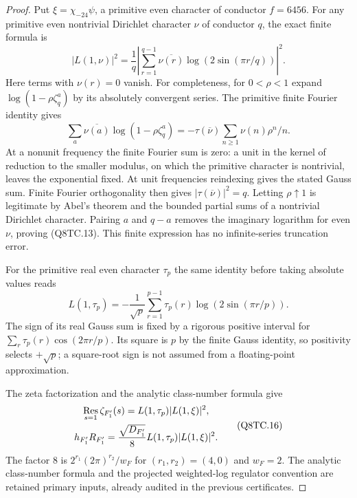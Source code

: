 \begin{proof}
Put $\xi=\chi_{-24}\psi$, a primitive even character of
conductor $f=6456$.
For any primitive even nontrivial Dirichlet character $\nu$ of
conductor $q$, the exact finite formula is
\[
 \left|L(1,\nu)\right|^2
   =\frac1q\left|
       \sum_{r=1}^{q-1}\overline{\nu(r)}
                     \log(2\sin(\pi r/q))\right|^2.
 \tag{Q8TC.13}
\]
Here terms with $\nu(r)=0$ vanish.
For completeness, for $0<\rho<1$ expand
$\log(1-\rho\zeta_q^a)$ by its absolutely convergent series.
The primitive finite Fourier identity gives
\[
 \sum_a\overline{\nu(a)}\log(1-\rho\zeta_q^a)
    =-\tau(\overline\nu)
                         \sum_{n\geq1}\nu(n)\rho^n/n.
 \tag{Q8TC.14}
\]
At a nonunit frequency the finite Fourier sum is zero: a unit
in the kernel of reduction to the smaller modulus, on which the
primitive character is nontrivial, leaves the exponential fixed.
At unit frequencies reindexing gives the stated Gauss sum.
Finite Fourier orthogonality then gives
$|\tau(\overline\nu)|^2=q$.
Letting $\rho\uparrow1$ is legitimate by Abel's theorem and
the bounded partial sums of a nontrivial Dirichlet character.
Pairing $a$ and $q-a$ removes the imaginary logarithm for even
$\nu$, proving (Q8TC.13).
This finite expression has no infinite-series truncation error.

For the primitive real even character $\tau_p$ the same identity
before taking absolute values reads
\[
 L(1,\tau_p)=-\frac1{\sqrt p}
       \sum_{r=1}^{p-1}\tau_p(r)\log(2\sin(\pi r/p)).
 \tag{Q8TC.15}
\]
The sign of its real Gauss sum is fixed by a rigorous positive
interval for $\sum_r\tau_p(r)\cos(2\pi r/p)$.
Its square is $p$ by the finite Gauss identity, so positivity
selects $+\sqrt p$; a square-root sign is not assumed from a
floating-point approximation.

The zeta factorization and the analytic class-number formula give
\[
 \begin{gathered}
 \mathop{\rm Res}_{s=1}\zeta_{F'_1}(s)
                  =L(1,\tau_p)|L(1,\xi)|^2,\\
 h_{F'_1}R_{F'_1}
        =\frac{\sqrt{D_{F'_1}}}{8}
                              L(1,\tau_p)|L(1,\xi)|^2.
 \end{gathered}
 \tag{Q8TC.16}
\]
The factor $8$ is $2^{r_1}(2\pi)^{r_2}/w_F$ for
$(r_1,r_2)=(4,0)$ and $w_F=2$.
The analytic class-number formula and the projected weighted-log
regulator convention are retained primary inputs, already audited
in the previous certificates.


\end{proof}
